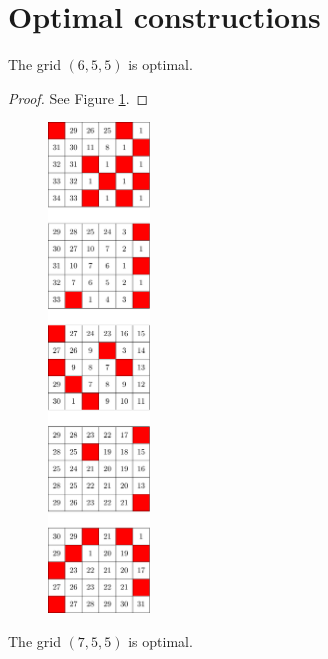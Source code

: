 \newpage

\section{Optimal constructions}

\begin{con}
\label{con:6x5x5}
The grid $(6,5,5)$ is optimal.
\end{con}

\begin{proof}
See Figure \ref{fig:6x5x5_numbered_heatmap}.
\end{proof}

\begin{figure}[H]
\centering
\includegraphics[width=0.24\textwidth]{figures/A/6x5x5_numbered_heatmap.pdf}
\caption{}
\label{fig:6x5x5_numbered_heatmap}
\end{figure}

\newpage

\begin{con}
\label{con:7x5x5}
The grid $(7,5,5)$ is optimal.
\end{con}

